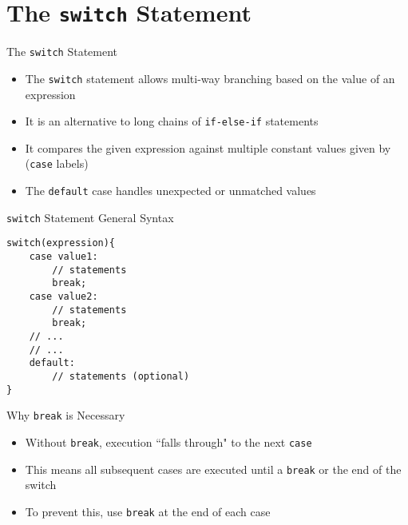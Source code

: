 \documentclass[12pt, aspectratio=169]{beamer}
\begin{document}






    \section{The \texttt{switch} Statement}

    \begin{frame}{The \texttt{switch} Statement}
        \begin{itemize}
            \item The \texttt{switch} statement allows multi-way branching based on the value of an expression
            \item It is an alternative to long chains of \texttt{if-else-if} statements
            \item It compares the given expression against multiple constant values given by (\texttt{case} labels)
            \item The \texttt{default} case handles unexpected or unmatched values
        \end{itemize}
    \end{frame}


    \begin{frame}[fragile]{\texttt{switch} Statement General Syntax}
        \begin{verbatim}
switch(expression){
    case value1:
        // statements
        break;
    case value2:
        // statements
        break;
    // ...
    // ...
    default:
        // statements (optional)
}
        \end{verbatim}
    \end{frame}


    \begin{frame}{Why \texttt{break} is Necessary}
        \begin{itemize}
            \item Without \texttt{break}, execution ``falls through" to the next \texttt{case}
            \item This means all subsequent cases are executed until a \texttt{break} or the end of the switch
            \item To prevent this, use \texttt{break} at the end of each case
        \end{itemize}
    \end{frame}
\end{document}
